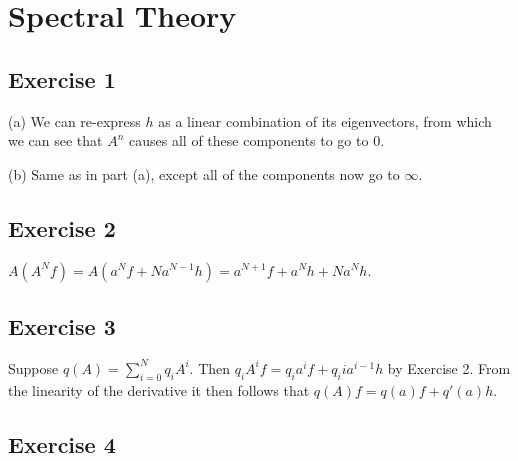\section{Spectral Theory}

\subsection{Exercise 1}
(a) We can re-express $h$ as a linear combination of its eigenvectors,
from which we can see that $A^n$ causes all of these components to go to 0.

(b) Same as in part (a), except all of the components now go to $\infty$.

\subsection{Exercise 2}
$A (A^N f) = A(a^N f + Na^{N - 1} h) = a^{N+1} f + a^N h + Na^N h$.

\subsection{Exercise 3}
Suppose $q(A) = \sum_{i = 0}^N q_i A^i$. Then $q_i A^i f = q_i a^i f + q_i i a^{i-1} h$ by
Exercise 2. From the linearity of the derivative it then follows that $q(A) f = q(a) f + q'(a) h$. 

\subsection{Exercise 4}

